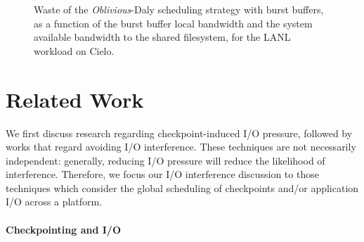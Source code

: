 \documentclass[two]{article}
\newcommand{\nocoop}{\emph{Oblivious}\xspace}
\def\propfixed{\nocoop-Fixed\xspace}
\def\propdaly{\nocoop-Daly\xspace}
\begin{document}
\begin{figure}
  \begin{minipage}{0.49\linewidth}
    \begin{center}
      \resizebox{\linewidth}{!}{}
    \end{center}
    \caption{Waste of the \propfixed scheduling
      strategy with burst buffers,  as a function of the burst buffer local bandwidth and the system
      available bandwidth to the shared filesystem,  for the LANL workload on
      Cielo.\label{fig:bb:bw:fixed}}
  \end{minipage}
  \begin{minipage}{0.49\linewidth}
    \begin{center}
      \resizebox{\linewidth}{!}{}
    \end{center}
    \caption{Waste of the \propdaly scheduling
      strategy  with burst buffers,  as a function of the burst buffer local bandwidth and the system
      available bandwidth to the shared filesystem, for the LANL workload on
      Cielo.\label{fig:bb:bw:daly}}
  \end{minipage}
\end{figure}


\section{Related Work}\label{sec:related}

We first discuss research regarding checkpoint-induced I/O pressure, followed by
works that regard avoiding I/O interference.  These techniques are not necessarily
independent: generally, reducing I/O pressure will reduce the likelihood of
interference.  Therefore, we focus our I/O interference discussion to those
techniques which consider the global scheduling of checkpoints and/or application I/O
across a platform.


\paragraph*{Checkpointing and I/O}
\end{document}
